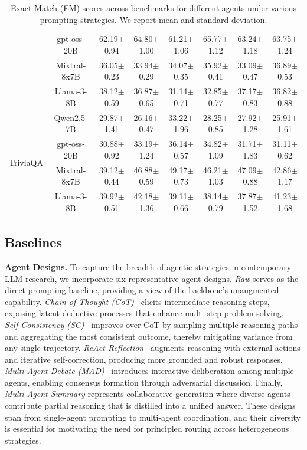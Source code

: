 \documentclass[11pt]{article}
\begin{document}
\begin{table}[t]
{\begin{tabular}{c c cccccc}
 & gpt-oss-20B  & 62.19$\pm$0.94 & 64.80$\pm$1.00 & 61.21$\pm$1.06 & 65.77$\pm$1.12 & 63.24$\pm$1.18 & 63.75$\pm$1.24 \\
 & Mixtral-8x7B & 36.05$\pm$0.23 & 33.94$\pm$0.29 & 34.07$\pm$0.35 & 35.92$\pm$0.41 & 33.09$\pm$0.47 & 36.89$\pm$0.53 \\
 & Llama-3-8B   & 38.12$\pm$0.59 & 36.87$\pm$0.65 & 31.14$\pm$0.71 & 32.85$\pm$0.77 & 37.17$\pm$0.83 & 36.82$\pm$0.88 \\
\midrule
\multirow{4}{*}{TriviaQA}
 & Qwen2.5-7B   & 29.87$\pm$1.41 & 26.16$\pm$0.47 & 33.22$\pm$1.96 & 28.25$\pm$0.85 & 27.92$\pm$1.28 & 25.91$\pm$1.61 \\
 & gpt-oss-20B  & 30.88$\pm$0.92 & 33.19$\pm$1.24 & 36.14$\pm$0.57 & 34.82$\pm$1.09 & 31.71$\pm$1.83 & 31.11$\pm$0.62 \\
 & Mixtral-8x7B & 39.12$\pm$0.44 & 46.88$\pm$0.59 & 49.17$\pm$0.73 & 46.21$\pm$1.03 & 47.09$\pm$0.88 & 42.86$\pm$1.17 \\
 & Llama-3-8B   & 39.92$\pm$0.51 & 42.18$\pm$1.36 & 39.11$\pm$0.66 & 38.14$\pm$0.79 & 37.87$\pm$1.52 & 41.23$\pm$1.68 \\
\bottomrule
\end{tabular}
}
\vspace{-5pt}
\caption{Exact Match (EM) scores across benchmarks for different agents under various prompting strategies. We report mean and standard deviation.}
\label{tab:em_results}
\vspace{-15pt}
\end{table}


\subsection{Baselines}
\label{appendix:Baselines}

\noindent\textbf{Agent Designs. } 
To capture the breadth of agentic strategies in contemporary LLM research, we incorporate six representative agent designs. \textit{Raw} serves as the direct prompting baseline, providing a view of the backbone’s unaugmented capability. \textit{Chain-of-Thought (CoT)}~\citep{wei2022chain} elicits intermediate reasoning steps, exposing latent deductive processes that enhance multi-step problem solving. \textit{Self-Consistency (SC)}~\citep{wang2023selfconsistency} improves over CoT by sampling multiple reasoning paths and aggregating the most consistent outcome, thereby mitigating variance from any single trajectory. \textit{ReAct-Reflection}~\citep{yao2023react, shinn2023reflexion} augments reasoning with external actions and iterative self-correction, producing more grounded and robust responses. \textit{Multi-Agent Debate (MAD)}~\citep{du2024mad} introduces interactive deliberation among multiple agents, enabling consensus formation through adversarial discussion. Finally, \textit{Multi-Agent Summary} represents collaborative generation where diverse agents contribute partial reasoning that is distilled into a unified answer. These designs span from single-agent prompting to multi-agent coordination, and their diversity is essential for motivating the need for principled routing across heterogeneous strategies.  
\end{document}
